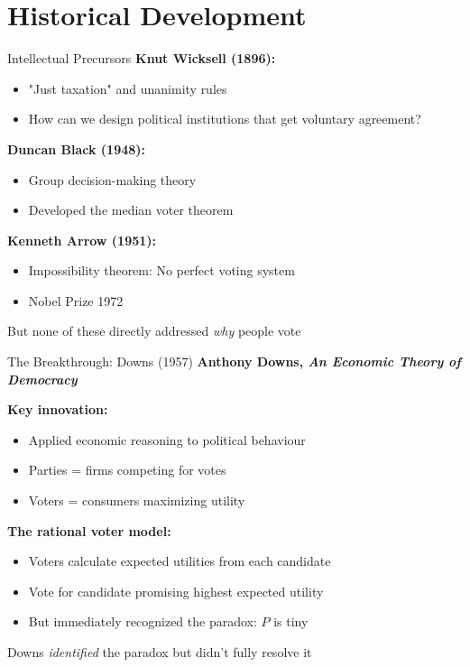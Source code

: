 \documentclass[10pt]{beamer}
\begin{document}
\section{Historical Development}

\begin{frame}{Intellectual Precursors}
\textbf{Knut Wicksell (1896):}
\begin{itemize}
\item "Just taxation" and unanimity rules
\item How can we design political institutions that get voluntary agreement?
\end{itemize}


\textbf{Duncan Black (1948):}
\begin{itemize}
\item Group decision-making theory
\item Developed the median voter theorem
\end{itemize}


\textbf{Kenneth Arrow (1951):}
\begin{itemize}
\item Impossibility theorem: No perfect voting system
\item Nobel Prize 1972
\end{itemize}


But none of these directly addressed \emph{why} people vote
\end{frame}

\begin{frame}{The Breakthrough: Downs (1957)}
\textbf{Anthony Downs, \emph{An Economic Theory of Democracy}}


\textbf{Key innovation:}
\begin{itemize}
\item Applied economic reasoning to political behaviour
\item Parties = firms competing for votes
\item Voters = consumers maximizing utility
\end{itemize}


\textbf{The rational voter model:}
\begin{itemize}
\item Voters calculate expected utilities from each candidate
\item Vote for candidate promising highest expected utility
\item But immediately recognized the paradox: $P$ is tiny
\end{itemize}


Downs \emph{identified} the paradox but didn't fully resolve it
\end{frame}
\end{document}
